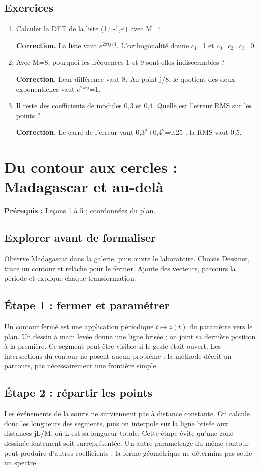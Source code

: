 \documentclass[11pt,a4paper]{article}
\begin{document}
\subsection*{Exercices}\begin{enumerate}
\item Calculer la DFT de la liste (1,i,-1,-i) avec M=4.
\par\textbf{Correction.} La liste vaut $e^{2\pi ij/4}$. L’orthogonalité donne $c_1$=1 et $c_0$=$c_2$=$c_3$=0.
\item Avec M=8, pourquoi les fréquences 1 et 9 sont-elles indiscernables ?
\par\textbf{Correction.} Leur différence vaut 8. Au point j/8, le quotient des deux exponentielles vaut $e^{2\pi ij}$=1.
\item Il reste des coefficients de modules 0,3 et 0,4. Quelle est l’erreur RMS sur les points ?
\par\textbf{Correction.} Le carré de l’erreur vaut 0,3$^2$+0,4$^2$=0,25 ; la RMS vaut 0,5.
\end{enumerate}
\clearpage
\section{Du contour aux cercles : Madagascar et au-delà}
\textbf{Prérequis :} Leçons 1 à 5 ; coordonnées du plan.
\subsection*{Explorer avant de formaliser}Observe Madagascar dans la galerie, puis ouvre le laboratoire. Choisis Dessiner, trace un contour et relâche pour le fermer. Ajoute des vecteurs, parcours la période et explique chaque transformation.
\subsection{Étape 1 : fermer et paramétrer}
Un contour fermé est une application périodique $t\mapsto z(t)$ du paramètre vers le plan. Un dessin à main levée donne une ligne brisée ; on joint sa dernière position à la première. Ce segment peut être visible si le geste était ouvert. Les intersections du contour ne posent aucun problème : la méthode décrit un parcours, pas nécessairement une frontière simple.
\subsection{Étape 2 : répartir les points}
Les événements de la souris ne surviennent pas à distance constante. On calcule donc les longueurs des segments, puis on interpole sur la ligne brisée aux distances jL/M, où L est sa longueur totale. Cette étape évite qu’une zone dessinée lentement soit surreprésentée. Un autre paramétrage du même contour peut produire d’autres coefficients : la forme géométrique ne détermine pas seule un spectre.
\end{document}
